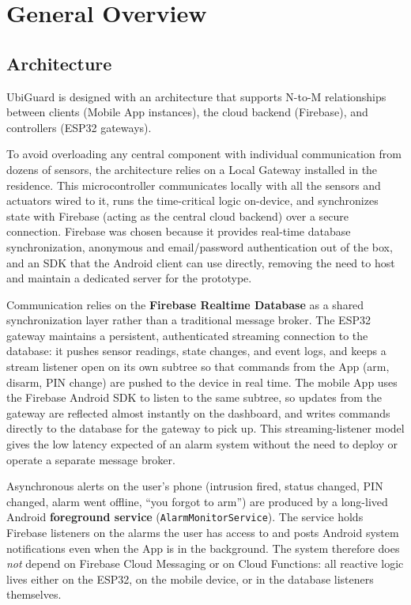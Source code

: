 \documentclass[10pt,twocolumn]{article}
\begin{document}
\section{General Overview}

\subsection{Architecture}
UbiGuard is designed with an architecture that supports N-to-M relationships between clients (Mobile App instances), the cloud backend (Firebase), and controllers (ESP32 gateways).

To avoid overloading any central component with individual communication from dozens of sensors, the architecture relies on a Local Gateway installed in the residence. This microcontroller communicates locally with all the sensors and actuators wired to it, runs the time-critical logic on-device, and synchronizes state with Firebase (acting as the central cloud backend) over a secure connection. Firebase was chosen because it provides real-time database synchronization, anonymous and email/password authentication out of the box, and an SDK that the Android client can use directly, removing the need to host and maintain a dedicated server for the prototype.

Communication relies on the \textbf{Firebase Realtime Database} as a shared synchronization layer rather than a traditional message broker. The ESP32 gateway maintains a persistent, authenticated streaming connection to the database: it pushes sensor readings, state changes, and event logs, and keeps a stream listener open on its own subtree so that commands from the App (arm, disarm, PIN change) are pushed to the device in real time. The mobile App uses the Firebase Android SDK to listen to the same subtree, so updates from the gateway are reflected almost instantly on the dashboard, and writes commands directly to the database for the gateway to pick up. This streaming-listener model gives the low latency expected of an alarm system without the need to deploy or operate a separate message broker.

Asynchronous alerts on the user's phone (intrusion fired, status changed, PIN changed, alarm went offline, ``you forgot to arm'') are produced by a long-lived Android \textbf{foreground service} (\texttt{AlarmMonitorService}). The service holds Firebase listeners on the alarms the user has access to and posts Android system notifications even when the App is in the background. The system therefore does \emph{not} depend on Firebase Cloud Messaging or on Cloud Functions: all reactive logic lives either on the ESP32, on the mobile device, or in the database listeners themselves.
\end{document}
